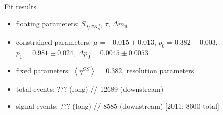 \documentclass{beamer}
\begin{document}
	
	\begin{frame}{Fit results}
	\begin{itemize}
		\item floating parameters: $S_{J/\Psi K_s^0}$, $\tau$, $\Delta m_d$
		\item constrained parameters: $\mu = -0.015\pm0.013$, $p_0 = 0.382\pm0.003$, $p_1=0.981\pm0.024$, $\Delta p_0 = 0.0045\pm0.0053$
		\item fixed parameters: $\left\langle \eta^{OS} \right\rangle = 0.382$, resolution parameters
		\item total events: ??? (long) // 12689 (downstream)
		\item signal events: ??? (long) // 8585 (downstream) [2011: 8600 total]
	\end{itemize}
	\end{frame}
\end{document}
